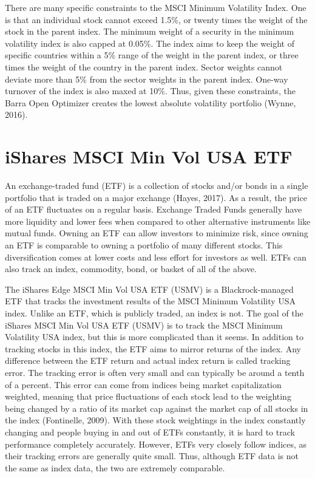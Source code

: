 \documentclass[12pt,twoside]{reedthesis}
\theoremstyle{definition}
\theoremstyle{definition}
\theoremstyle{definition}
\theoremstyle{remark}
\begin{document}
There are many specific constraints to the MSCI Minimum Volatility
Index. One is that an individual stock cannot exceed 1.5\%, or twenty
times the weight of the stock in the parent index. The minimum weight of
a security in the minimum volatility index is also capped at 0.05\%. The
index aims to keep the weight of specific countries within a 5\% range
of the weight in the parent index, or three times the weight of the
country in the parent index. Sector weights cannot deviate more than 5\%
from the sector weights in the parent index. One-way turnover of the
index is also maxed at 10\%. Thus, given these constraints, the Barra
Open Optimizer creates the lowest absolute volatility portfolio (Wynne,
2016).

\section{iShares MSCI Min Vol USA
ETF}\label{ishares-msci-min-vol-usa-etf}

An exchange-traded fund (ETF) is a collection of stocks and/or bonds in
a single portfolio that is traded on a major exchange (Hayes, 2017). As
a result, the price of an ETF fluctuates on a regular basis. Exchange
Traded Funds generally have more liquidity and lower fees when compared
to other alternative instruments like mutual funds. Owning an ETF can
allow investors to minimize risk, since owning an ETF is comparable to
owning a portfolio of many different stocks. This diversification comes
at lower costs and less effort for investors as well. ETFs can also
track an index, commodity, bond, or basket of all of the above.

The iShares Edge MSCI Min Vol USA ETF (USMV) is a Blackrock-managed ETF
that tracks the investment results of the MSCI Minimum Volatility USA
index. Unlike an ETF, which is publicly traded, an index is not. The
goal of the iShares MSCI Min Vol USA ETF (USMV) is to track the MSCI
Minimum Volatility USA index, but this is more complicated than it
seems. In addition to tracking stocks in this index, the ETF aims to
mirror returns of the index. Any difference between the ETF return and
actual index return is called tracking error. The tracking error is
often very small and can typically be around a tenth of a percent. This
error can come from indices being market capitalization weighted,
meaning that price fluctuations of each stock lead to the weighting
being changed by a ratio of its market cap against the market cap of all
stocks in the index (Fontinelle, 2009). With these stock weightings in
the index constantly changing and people buying in and out of ETFs
constantly, it is hard to track performance completely accurately.
However, ETFs very closely follow indices, as their tracking errors are
generally quite small. Thus, although ETF data is not the same as index
data, the two are extremely comparable.
\end{document}
